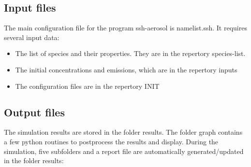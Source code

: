 \documentclass[a4paper,11pt]{article}
\begin{document}
\subsection{Input files}
The main configuration file for the program ssh-aerosol is namelist.ssh. It requires several input data:
\begin{itemize}
\item The list of species and their properties. They are in the repertory species-list. 
\item The initial concentrations and emissions, which are in the repertory inputs
\item The configuration files are in the repertory INIT
\end{itemize}

\subsection{Output files}
The simulation results are stored in the folder results. The folder graph contains a few python routines to postprocess the results and display.
During the simulation, five subfolders and a report file are automatically generated/updated in the folder results:
\end{document}
